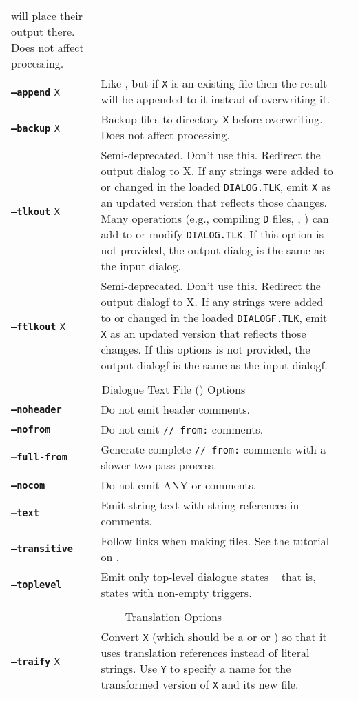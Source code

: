 \documentclass{article}
\def\ttref#1{\ahrefloc{#1}{\tt #1}}
\def\DEFINE#1{{\tt \bf #1}\label{#1}\index{#1}}
\def\t#1{{\tt #1}}
\begin{document}
\begin{tabular}{lp{10in}|p{10in}}
will place their output there.  Does not affect \ttref{TP2} processing. \\
\DEFINE{--append} \t{X} & Like \ttref{--out}, but if \t{X} is an existing
file then the result will be appended to it instead of overwriting it. \\
\DEFINE{--backup} \t{X} &	Backup files to directory {\tt X} before overwriting. Does not affect \ttref{TP2} processing. \\
\DEFINE{--tlkout} \t{X} & Semi-deprecated. Don't use this. Redirect the output dialog to X. If any strings were added to or changed in the loaded \t{DIALOG.TLK}, emit \t{X} as an updated version that reflects those changes. Many operations (e.g., compiling \t{D} files, \ttref{--tlkmerge}, \ttref{STRING!SET}) can add to or modify \t{DIALOG.TLK}. If this option is not provided, the output dialog is the same as the input dialog. \\
\DEFINE{--ftlkout} \t{X} & Semi-deprecated. Don't use this. Redirect the output dialogf to X. If any strings were added to or changed in the
loaded \t{DIALOGF.TLK}, emit \t{X} as an updated version that reflects
those changes. If this options is not provided, the output dialogf is the same as the input dialogf. \\
\\
\multicolumn{2}{c}{ \color{red} Dialogue Text File (\ttref{D}) Options} \\
\DEFINE{--noheader} &	Do not emit \ttref{D} header comments. \\
\DEFINE{--nofrom} &	Do not emit \ttref{D} {\tt // from:} comments. \\
\DEFINE{--full-from} &  Generate complete {\tt // from:} comments with a
slower two-pass process. \\
\DEFINE{--nocom} & Do not emit ANY \ttref{D} or \ttref{BAF} comments. \\
\DEFINE{--text} & Emit string text with string references in comments. \\
\DEFINE{--transitive} & Follow \ttref{EXTERN} links when making \ttref{D}
files. See the tutorial on \ttref{--transitive}. \\
\DEFINE{--toplevel} & Emit only top-level dialogue states -- that is,
states with non-empty triggers. \\
\\
\multicolumn{2}{c}{ \color{red} Translation Options} \\
\DEFINE{--traify} \t{X} & Convert \t{X} (which should be a \ttref{D} or \ttref{TP2} or \ttref{BAF}) so that it uses translation references instead of literal strings. Use \ttref{--out} \t{Y} to specify a name for the transformed version of \t{X} and its new \ttref{TRA} file. \\

\end{tabular}
\end{document}
